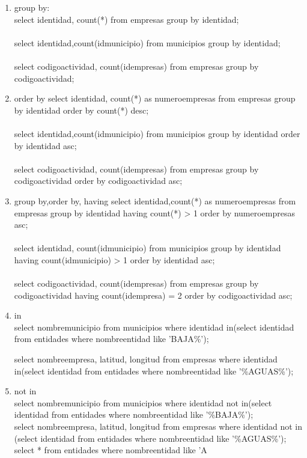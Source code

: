 \documentclass[10pt]{article}         %
\begin{document}
\begin{enumerate}
\item
group by:\\
select identidad, count(*) from empresas group by identidad;\\
\\
select identidad,count(idmunicipio) from municipios group by identidad;\\
\\
select codigoactividad, count(idempresas) from empresas group by codigoactividad;


\item
order by
select identidad, count(*) as numeroempresas from empresas group by identidad order by count(*) desc;\\
\\
select identidad,count(idmunicipio) from municipios group by identidad order by identidad asc;\\
\\
select codigoactividad, count(idempresas) from empresas group by codigoactividad order by codigoactividad asc;

\item 
group by,order by, having
select identidad,count(*) as numeroempresas from empresas group by identidad having count(*) > 1 order by numeroempresas asc;\\
\\
select identidad, count(idmunicipio) from municipios group by identidad having count(idmunicipio) > 1 order by identidad asc;\\
\\
select codigoactividad, count(idempresas) from empresas group by codigoactividad having count(idempresa) = 2 order by codigoactividad asc;

\item in\\
select nombremunicipio from municipios where identidad in(select identidad from entidades where nombreentidad like 'BAJA\%');

select nombreempresa, latitud, longitud from empresas where identidad in(select identidad from entidades where nombreentidad like '\%AGUAS\%');

\item not in\\
	select nombremunicipio from municipios where identidad not in(select identidad from entidades where nombreentidad like '\%BAJA\%');
	\\
	select nombreempresa, latitud, longitud from empresas where identidad not in (select identidad from entidades where nombreentidad like '\%AGUAS\%');
\\
select * from entidades where nombreentidad like 'A%


\end{enumerate}
\end{document}
